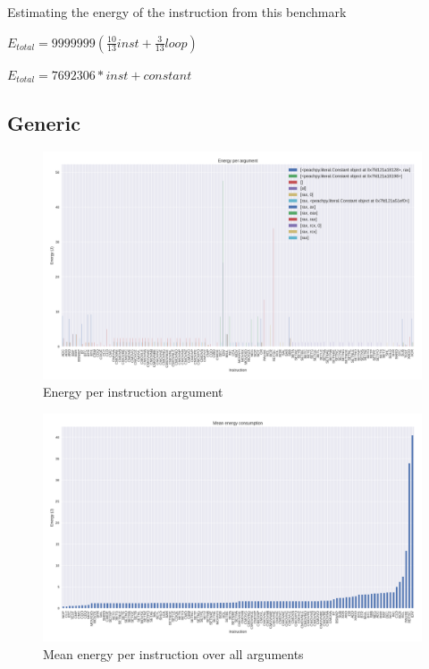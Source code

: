 Estimating the energy of the instruction from this benchmark

$E_{total}=9999999(\frac{10}{13}inst+\frac{3}{13}loop)$

$E_{total}=7692306*inst+constant$

\subsection{Generic}

\begin{figure}
	\centering
	\includegraphics[width=\textwidth]{experiments/figures/inst_en_args_generic.png}
	\caption{Energy per instruction argument}
	\label{fig:experiment_en1}
\end{figure}

\begin{figure}
	\centering
	\includegraphics[width=\textwidth]{experiments/figures/inst_mean_en_generic.png}
	\caption{Mean energy per instruction over all arguments}
	\label{fig:experiment_en2}
\end{figure}

